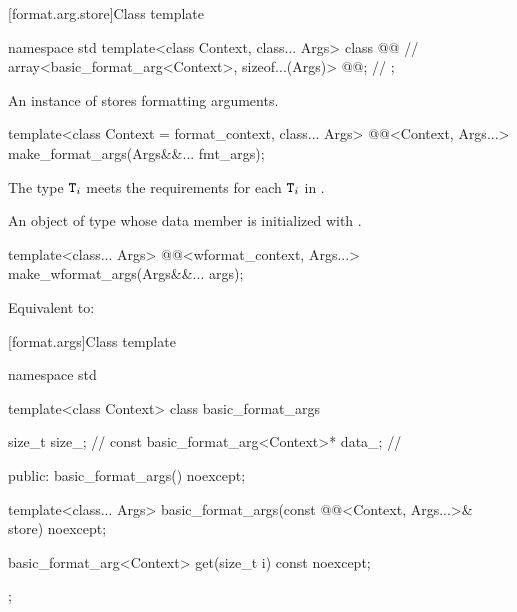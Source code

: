 [format.arg.store]{Class template }

\begin{codeblock}
namespace std {
  template<class Context, class... Args>
  class @@ {                                      // \expos
    array<basic_format_arg<Context>, sizeof...(Args)> @@;     // \expos
  };
}
\end{codeblock}

\pnum
An instance of  stores formatting arguments.

%
\begin{itemdecl}
template<class Context = format_context, class... Args>
  @@<Context, Args...> make_format_args(Args&&... fmt_args);
\end{itemdecl}

\begin{itemdescr}
\pnum
\expects
The type
$\texttt{T}_i$\tcode{>}
meets the  requirements
for each $\texttt{T}_i$ in .

\pnum
\returns
An object of type 
whose  data member is initialized with
.
\end{itemdescr}

%
\begin{itemdecl}
template<class... Args>
  @@<wformat_context, Args...> make_wformat_args(Args&&... args);
\end{itemdecl}

\begin{itemdescr}
\pnum
\effects
Equivalent to:
\end{itemdescr}

[format.args]{Class template }

\begin{codeblock}
namespace std {
  template<class Context>
  class basic_format_args {
    size_t size_;                               // \expos
    const basic_format_arg<Context>* data_;     // \expos

  public:
    basic_format_args() noexcept;

    template<class... Args>
      basic_format_args(const @@<Context, Args...>& store) noexcept;

    basic_format_arg<Context> get(size_t i) const noexcept;
  };
}
\end{codeblock}

